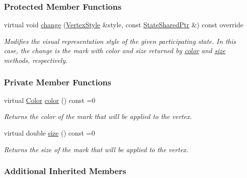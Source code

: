 \subsubsection*{Protected Member Functions}
\begin{DoxyCompactItemize}
\item 
virtual void \hyperlink{structevent_1_1VertexEmphasis_a7766c6d137289cf309cafd190957a01f}{change} (\hyperlink{structVertexStyle}{Vertex\+Style} \&style, const \hyperlink{structevent_1_1UniformChange_a8f41f1a24c711875b55419d9f0eb6bd2}{State\+Shared\+Ptr} \&) const override\hypertarget{structevent_1_1VertexEmphasis_a7766c6d137289cf309cafd190957a01f}{}\label{structevent_1_1VertexEmphasis_a7766c6d137289cf309cafd190957a01f}

\begin{DoxyCompactList}\small\item\em Modifies the visual representation style of the given participating state. In this case, the change is the mark with color and size returned by \hyperlink{structevent_1_1VertexEmphasis_ae9052ba6963c84824922b4c8df56146c}{color} and \hyperlink{structevent_1_1VertexEmphasis_a2213738af67f360ce354f237052ed4fb}{size} methods, respectively. \end{DoxyCompactList}\end{DoxyCompactItemize}
\subsubsection*{Private Member Functions}
\begin{DoxyCompactItemize}
\item 
virtual \hyperlink{colors_8h_ab87bacfdad76e61b9412d7124be44c1c}{Color} \hyperlink{structevent_1_1VertexEmphasis_ae9052ba6963c84824922b4c8df56146c}{color} () const =0
\begin{DoxyCompactList}\small\item\em Returns the color of the mark that will be applied to the vertex. \end{DoxyCompactList}\item 
virtual double \hyperlink{structevent_1_1VertexEmphasis_a2213738af67f360ce354f237052ed4fb}{size} () const =0
\begin{DoxyCompactList}\small\item\em Returns the size of the mark that will be applied to the vertex. \end{DoxyCompactList}\end{DoxyCompactItemize}
\subsubsection*{Additional Inherited Members}


